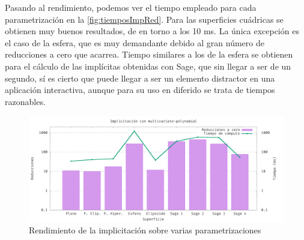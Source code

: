 \begin{table}[]
\begin{tabularx}
  \bottomrule
  \end{tabularx}
  \caption{Superficies usadas en los tests de implicitación}
  \label{fig:superficiesRac}
\end{table}

Pasando al rendimiento, podemos ver el tiempo empleado para cada parametrización en la \autoref{fig:tiemposImpRed}. Para las superficies cuádricas se obtienen muy buenos resultados, de en torno a los 10 ms. La única excepción es el caso de la esfera, que es muy demandante debido al gran número de reducciones a cero que acarrea. Tiempo similares a los de la esfera se obtienen para el cálculo de las implícitas obtenidas con Sage, que sin llegar a ser de un segundo, sí es cierto que puede llegar a ser un elemento distractor en una aplicación interactiva, aunque para su uso en diferido se trata de tiempos razonables.\newline
\begin{figure}[!ht]
    \centering
    \includegraphics[width=\textwidth]{Plantilla-TFG-master/img/graficas/TiemposImpRed.png}
    \caption{Rendimiento de la implicitación sobre varias parametrizaciones}
    \label{fig:tiemposImpRed}
\end{figure}

